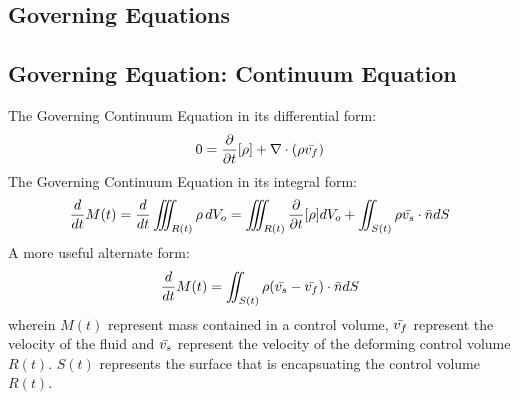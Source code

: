\documentclass[a4paper, 12pt]{report}
\begin{document}
\begin{center}
\chapter{Governing Equations}
\begin{comment}
\end{comment}
\section{Governing Equation: Continuum Equation}
\begin{comment}
Governing Equation: Continuum Equation
\end{comment}
The Governing Continuum Equation in its differential form:
$$0 = \frac{\partial}{\partial t}[\rho] +  \nabla \cdot (\rho\bar{v_f})$$
The Governing Continuum Equation in its integral form:
$$\frac{d}{dt} M(t) = \frac{d}{dt} \iiint_{R(t)} \rho \,dV_o = \iiint_{R(t)}\frac{\partial}{\partial t}[\rho]dV_o + \iint_{S(t)}\rho\bar{v_s}\cdot\bar{n}dS$$
A more useful alternate form:
$$\frac{d}{dt} M(t) = \iint_{S(t)}\rho(\bar{v_s} -\bar{v_f})\cdot\bar{n}dS$$
wherein $M(t)$ represent mass contained in a control volume, $\displaystyle{\bar{v_f}}$ represent the velocity of the fluid and $\displaystyle{\bar{v_s}}$ represent the velocity of the deforming control volume $R(t)$. $S(t)$ represents the surface that is encapsuating the control volume $R(t)$. 

\end{center}
\end{document}
